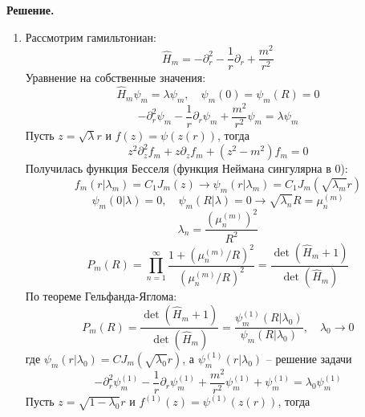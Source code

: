 \documentclass[12pt]{article}
\theoremstyle{definition}
\begin{document}
\textbf{Решение.}
\begin{enumerate}
    \item Рассмотрим гамильтониан:
    \begin{equation}
        \hat{H}_m=-\partial^2_r-\frac{1}{r}\partial_r+\frac{m^2}{r^2}
    \end{equation}
    Уравнение на собственные значения:
    \begin{equation}
        \hat{H}_m\psi_m=\lambda\psi_m,\quad\psi_m(0)=\psi_m(R)=0
    \end{equation}
    \begin{equation}
        -\partial^2_r\psi_m-\frac{1}{r}\partial_r\psi_m+\frac{m^2}{r^2}\psi_m=\lambda\psi_m
    \end{equation}
    Пусть $z=\sqrt{\lambda}r$ и $f(z)=\psi(z(r))$, тогда
    \begin{equation}
        z^2\partial^2_zf_m+z\partial_zf_m+(z^2-m^2)f_m=0
    \end{equation}
    Получилась функция Бесселя (функция Неймана сингулярна в 0):
    \begin{equation}
        f_m(r|\lambda_m)=C_1J_m(z)\rightarrow\psi_m(r|\lambda_m)=C_1J_m(\sqrt{\lambda_m}r)
    \end{equation}
    \begin{equation}
        \psi_m(0|\lambda)=0,\quad\psi_m(R|\lambda)=0\rightarrow\sqrt{\lambda_n}R=\mu^{(m)}_n
    \end{equation}
    \begin{equation}
        \lambda_n=\frac{(\mu^{(m)}_n)^2}{R^2}
    \end{equation}
    \begin{equation}
        P_m(R)=\prod\limits_{n=1}^\infty\frac{1+(\mu^{(m)}_n/R)^2}{(\mu^{(m)}_n/R)^2}=\frac{\det(\hat{H}_m+1)}{\det(\hat{H}_m)}
    \end{equation}
    По теореме Гельфанда-Яглома:
    \begin{equation}
        P_m(R)=\frac{\det(\hat{H}_m+1)}{\det(\hat{H}_m)}=\frac{\psi^{(1)}_m(R|\lambda_0)}{\psi_m(R|\lambda_0)},\quad\lambda_0\rightarrow0
    \end{equation}
    где $\psi_m(r|\lambda_0)=CJ_m(\sqrt{\lambda_0}r)$, а $\psi^{(1)}_m(r|\lambda_0)$ -- решение задачи
    \begin{equation}
        -\partial^2_r\psi^{(1)}_m-\frac{1}{r}\partial_r\psi^{(1)}_m+\frac{m^2}{r^2}\psi^{(1)}_m+\psi^{(1)}_m=\lambda_0\psi^{(1)}_m
    \end{equation}
    Пусть $z=\sqrt{1-\lambda_0}r$ и $f^{(1)}(z)=\psi^{(1)}(z(r))$, тогда

\end{enumerate}
\end{document}
